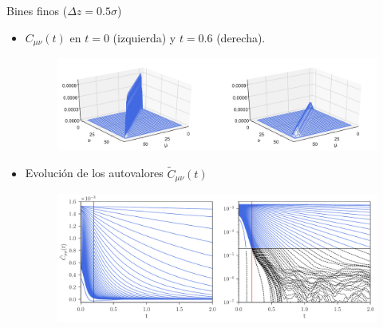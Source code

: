 \documentclass{beamer}
\newcommand{\esc}{\!\cdot\!}
\begin{document}
%

\begin{frame}{Bines finos ($\Delta z=0.5\sigma$)}
  \begin{itemize}
    \item<1-> $C_{\mu\nu}(t)$ en  $t=0$ (izquierda) y $t=0.6$ (derecha).
\begin{figure}[h!]
\includegraphics[width=\linewidth]{Ct-matrix-WALLS-66nodes}
\end{figure}
\item<2-> Evolución de los autovalores $\tilde{C}_{\mu\nu}(t)$
\begin{figure}[h!]
  \includegraphics[width=\linewidth]{CtRec-WALLS-66nodes-exp}
\end{figure}
\end{itemize}
\end{frame}
\end{document}
